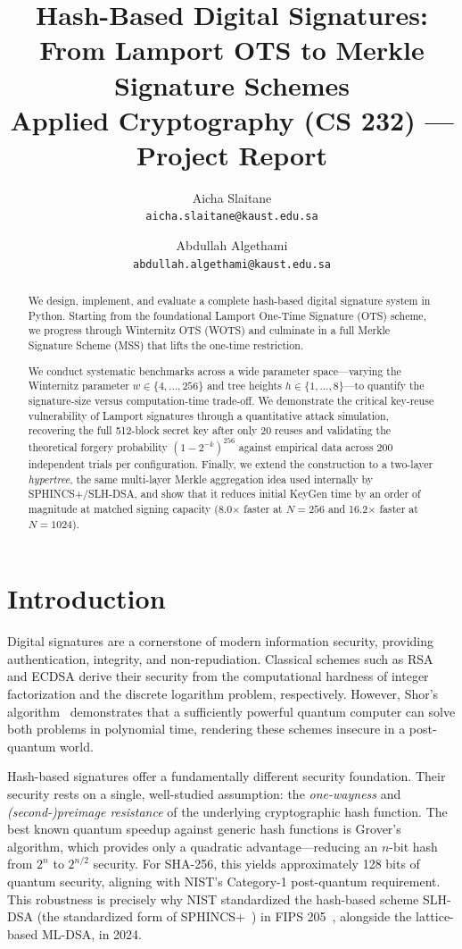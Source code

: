 \documentclass[10pt,a4paper,twocolumn]{article}
\title{\vspace{-1.5em}\textbf{Hash-Based Digital Signatures:\\From Lamport OTS to Merkle Signature Schemes}\\[0.3em]
\large Applied Cryptography (CS 232) --- Project Report}
\author{Aicha Slaitane\\\texttt{aicha.slaitane@kaust.edu.sa} \and Abdullah Algethami\\\texttt{abdullah.algethami@kaust.edu.sa}}
\date{}
\begin{document}
\maketitle

\begin{abstract}
\noindent
We design, implement, and evaluate a complete hash-based digital signature system in Python. Starting from the foundational Lamport One-Time Signature (OTS) scheme, we progress through Winternitz OTS (WOTS) and culminate in a full Merkle Signature Scheme (MSS) that lifts the one-time restriction.

We conduct systematic benchmarks across a wide parameter space---varying the Winternitz parameter $w \in \{4,\dots,256\}$ and tree heights $h \in \{1,\dots,8\}$---to quantify the signature-size versus computation-time trade-off. We demonstrate the critical key-reuse vulnerability of Lamport signatures through a quantitative attack simulation, recovering the full 512-block secret key after only 20 reuses and validating the theoretical forgery probability $(1-2^{-k})^{256}$ against empirical data across 200 independent trials per configuration. Finally, we extend the construction to a two-layer \emph{hypertree}, the same multi-layer Merkle aggregation idea used internally by SPHINCS+/SLH-DSA, and show that it reduces initial KeyGen time by an order of magnitude at matched signing capacity (8.0$\times$ faster at $N\!=\!256$ and 16.2$\times$ faster at $N\!=\!1024$).
\end{abstract}

\section{Introduction}

Digital signatures are a cornerstone of modern information security, providing authentication, integrity, and non-repudiation. Classical schemes such as RSA and ECDSA derive their security from the computational hardness of integer factorization and the discrete logarithm problem, respectively. However, Shor's algorithm~\cite{shor1994} demonstrates that a sufficiently powerful quantum computer can solve both problems in polynomial time, rendering these schemes insecure in a post-quantum world.

Hash-based signatures offer a fundamentally different security foundation. Their security rests on a single, well-studied assumption: the \emph{one-wayness} and \emph{(second-)preimage resistance} of the underlying cryptographic hash function. The best known quantum speedup against generic hash functions is Grover's algorithm, which provides only a quadratic advantage---reducing an $n$-bit hash from $2^n$ to $2^{n/2}$ security. For SHA-256, this yields approximately 128 bits of quantum security, aligning with NIST's Category-1 post-quantum requirement. This robustness is precisely why NIST standardized the hash-based scheme SLH-DSA (the standardized form of SPHINCS+~\cite{sphincs}) in FIPS 205~\cite{fips205}, alongside the lattice-based ML-DSA, in 2024.
\end{document}
